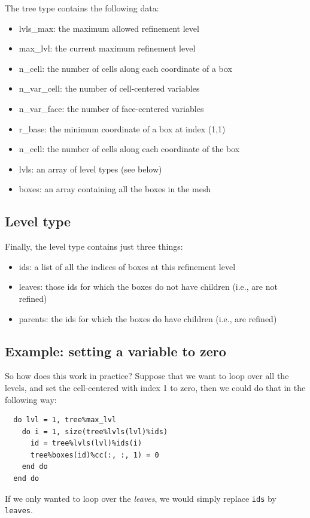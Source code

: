 \documentclass[a4paper, a4wide]{article}
\begin{document}
The tree type contains the following data:
\begin{itemize}
  \item lvls\_max: the maximum allowed refinement level
  \item max\_lvl: the current maximum refinement level
  \item n\_cell: the number of cells along each coordinate of a box
  \item n\_var\_cell: the number of cell-centered variables
  \item n\_var\_face: the number of face-centered variables
  \item r\_base: the minimum coordinate of a box at index (1,1)
  \item n\_cell: the number of cells along each coordinate of the box
  \item lvls: an array of level types (see below)
  \item boxes: an array containing all the boxes in the mesh
\end{itemize}

\subsection{Level type}
\label{sec:level-type}

Finally, the level type contains just three things:
\begin{itemize}
  \item ids: a list of all the indices of boxes at this refinement level
  \item leaves: those ids for which the boxes do not have children (i.e., are
  not refined)
  \item parents: the ids for which the boxes do have children (i.e., are refined)
\end{itemize}

\subsection{Example: setting a variable to zero}
\label{sec:data-types-example}

So how does this work in practice? Suppose that we want to loop over all the
levels, and set the cell-centered with index 1 to zero, then we could do that in
the following way:
\begin{lstlisting}
  do lvl = 1, tree%max_lvl
    do i = 1, size(tree%lvls(lvl)%ids)
      id = tree%lvls(lvl)%ids(i)
      tree%boxes(id)%cc(:, :, 1) = 0
    end do
  end do
\end{lstlisting}
If we only wanted to loop over the \emph{leaves}, we would simply replace \texttt{ids}
by \texttt{leaves}.
\end{document}
